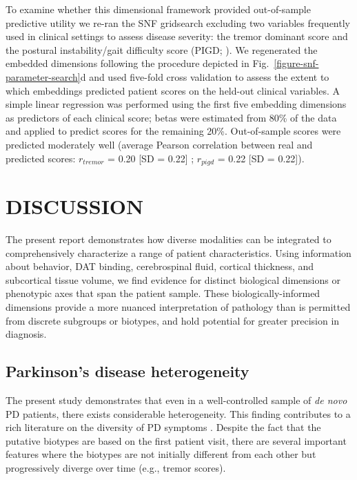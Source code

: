\documentclass[12pt,aps,pra,reprint,showkeys]{revtex4-1}
\begin{document}
To examine whether this dimensional framework provided out-of-sample predictive utility we re-ran the SNF gridsearch excluding two variables frequently used in clinical settings to assess disease severity: the tremor dominant score and the postural instability/gait difficulty score (PIGD; \citep{stebbins2013identify}).
We regenerated the embedded dimensions following the procedure depicted in Fig.~\ref{figure-snf-parameter-search}d and used five-fold cross validation to assess the extent to which embeddings predicted patient scores on the held-out clinical variables.
A simple linear regression was performed using the first five embedding dimensions as predictors of each clinical score; betas were estimated from 80\% of the data and applied to predict scores for the remaining 20\%.
Out-of-sample scores were predicted moderately well (average Pearson correlation between real and predicted scores: $r_{tremor}$ = 0.20 [SD = 0.22] ; $r_{pigd}$ = 0.22 [SD = 0.22]).

\section*{DISCUSSION}

The present report demonstrates how diverse modalities can be integrated to comprehensively characterize a range of patient characteristics.
Using information about behavior, DAT binding, cerebrospinal fluid, cortical thickness, and subcortical tissue volume, we find evidence for distinct biological dimensions or phenotypic axes that span the patient sample.
These biologically-informed dimensions provide a more nuanced interpretation of pathology than is permitted from discrete subgroups or biotypes, and hold potential for greater precision in diagnosis.

\subsection*{Parkinson's disease heterogeneity}

The present study demonstrates that even in a well-controlled sample of \textit{de novo} PD patients, there exists considerable heterogeneity. 
This finding contributes to a rich literature on the diversity of PD symptoms \citep{espay2017biomarker, fereshtehnejad2017clinical, thenganatt2014jamaneurol, erro2016parkinsonismrelatd, lawton2015jparkinsondis, lawton2018jneurolneurosurgpsychiatry, sandor2019biorxiv}.
Despite the fact that the putative biotypes are based on the first patient visit, there are several important features where the biotypes are not initially different from each other but progressively diverge over time (e.g., tremor scores).
\end{document}
